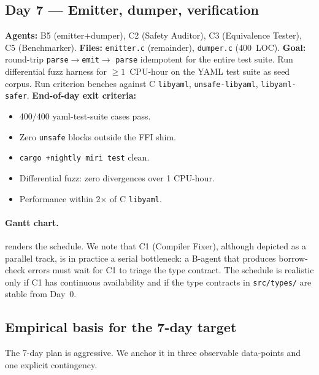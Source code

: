 \documentclass[12pt]{article}
\theoremstyle{definition}
\theoremstyle{remark}
\begin{document}
\subsection*{Day 7 --- Emitter, dumper, verification}
\textbf{Agents:} B5 (emitter+dumper), C2 (Safety Auditor),
C3 (Equivalence Tester), C5 (Benchmarker).
\textbf{Files:} \texttt{emitter.c} (remainder), \texttt{dumper.c}
(400~LOC).
\textbf{Goal:} round-trip \texttt{parse}$\to$\texttt{emit}$\to$
\texttt{parse} idempotent for the entire test suite. Run differential
fuzz harness for $\ge 1$~CPU-hour on the YAML test suite as seed
corpus. Run criterion benches against C \texttt{libyaml},
\texttt{unsafe-libyaml}, \texttt{libyaml-safer}.
\textbf{End-of-day exit criteria:}
\begin{itemize}
\item 400/400 yaml-test-suite cases pass.
\item Zero \texttt{unsafe} blocks outside the FFI shim.
\item \texttt{cargo +nightly miri test} clean.
\item Differential fuzz: zero divergences over 1 CPU-hour.
\item Performance within 2$\times$ of C \texttt{libyaml}.
\end{itemize}

\paragraph{Gantt chart.}  renders the schedule. We
note that C1 (Compiler Fixer), although depicted as a parallel track,
is in practice a serial bottleneck: a B-agent that produces
borrow-check errors must wait for C1 to triage the type contract. The
schedule is realistic only if C1 has continuous availability and if
the type contracts in \texttt{src/types/} are stable from Day~0.

\subsection{Empirical basis for the 7-day target}

The 7-day plan is aggressive. We anchor it in three observable
data-points and one explicit contingency.
\end{document}
